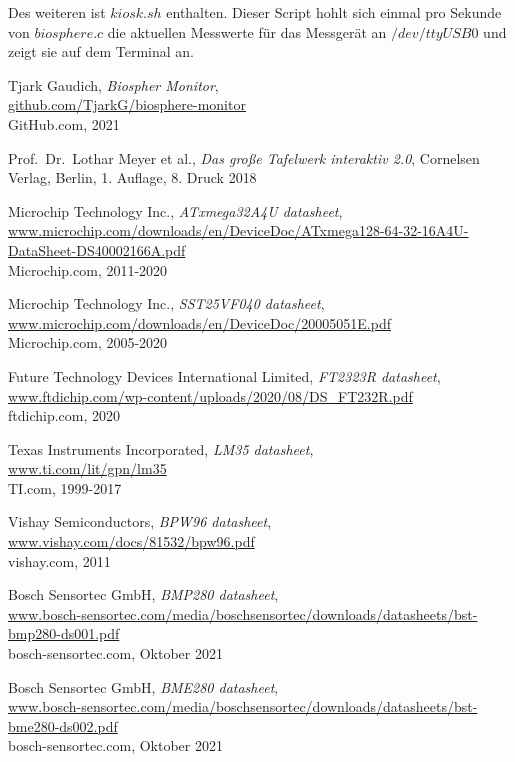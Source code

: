 \documentclass[12pt, a4paper, oneside]{report}
\begin{document}
Des weiteren ist $kiosk.sh$ enthalten.
Dieser Script hohlt sich einmal pro Sekunde von $biosphere.c$ die aktuellen Messwerte für das Messgerät 
an $/dev/ttyUSB0$ und zeigt sie auf dem Terminal an.
\begin{thebibliography}{9}
\raggedright 

  Tjark Gaudich,
  \textit{Biospher Monitor},\\
  \url{github.com/TjarkG/biosphere-monitor}\\
  GitHub.com,
  2021
  
  Prof.~Dr.~Lothar Meyer et al.,
  \textit{Das große Tafelwerk interaktiv 2.0},
  Cornelsen Verlag, Berlin,
  1. Auflage, 8. Druck 2018
  
  Microchip Technology Inc.,
  \textit{ATxmega32A4U datasheet},\\
  \url{www.microchip.com/downloads/en/DeviceDoc/ATxmega128-64-32-16A4U-DataSheet-DS40002166A.pdf}\\
  Microchip.com,
  2011-2020
  
  Microchip Technology Inc.,
  \textit{SST25VF040 datasheet},\\
  \url{www.microchip.com/downloads/en/DeviceDoc/20005051E.pdf}\\
  Microchip.com,
  2005-2020
  
  Future Technology Devices International Limited,
  \textit{FT2323R datasheet},\\
  \url{www.ftdichip.com/wp-content/uploads/2020/08/DS_FT232R.pdf}\\
  ftdichip.com, 2020
  
  Texas Instruments Incorporated,
  \textit{LM35 datasheet},\\
  \url{www.ti.com/lit/gpn/lm35}\\
  TI.com,
  1999-2017
  
  Vishay Semiconductors,
  \textit{BPW96 datasheet},\\
  \url{www.vishay.com/docs/81532/bpw96.pdf}\\
  vishay.com,
  2011
  
  Bosch Sensortec GmbH,
  \textit{BMP280 datasheet},\\
  \url{www.bosch-sensortec.com/media/boschsensortec/downloads/datasheets/bst-bmp280-ds001.pdf}\\
  bosch-sensortec.com,
  Oktober 2021
  
  Bosch Sensortec GmbH,
  \textit{BME280 datasheet},\\
  \url{www.bosch-sensortec.com/media/boschsensortec/downloads/datasheets/bst-bme280-ds002.pdf}\\
  bosch-sensortec.com,
  Oktober 2021
  

\end{thebibliography}
\end{document}
